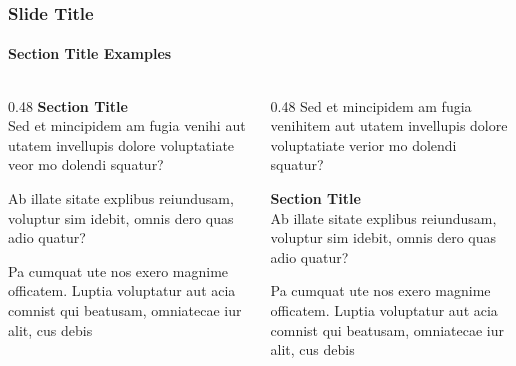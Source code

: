 \documentclass[
	aspectratio=169, %
	t, %
	onlytextwidth, %
	10pt, %
]{beamer}
\begin{document}
\begin{frame}
	\frametitle{Slide Title}
	\framesubtitle{Section Title Examples}
	
	\begin{columns}[T] %
		\begin{column}{0.48\linewidth} %
			\textbf{Section Title}\\
			Sed et mincipidem am fugia venihi aut utatem invellupis dolore voluptatiate veor mo dolendi squatur?
	
			Ab illate sitate explibus reiundusam, voluptur sim idebit, omnis dero quas adio quatur?
	
			Pa cumquat ute nos exero magnime officatem. Luptia voluptatur aut acia comnist qui beatusam, omniatecae iur alit, cus debis
		\end{column}
		\begin{column}{0.48\linewidth} %
			Sed et mincipidem am fugia venihitem aut utatem invellupis dolore voluptatiate verior mo dolendi squatur?
		
			\textbf{Section Title}\\
			Ab illate sitate explibus reiundusam, voluptur sim idebit, omnis dero quas adio quatur?
			
			Pa cumquat ute nos exero magnime officatem. Luptia voluptatur aut acia comnist qui beatusam, omniatecae iur alit, cus debis
		\end{column}
	\end{columns}
\end{frame}

\end{document}
